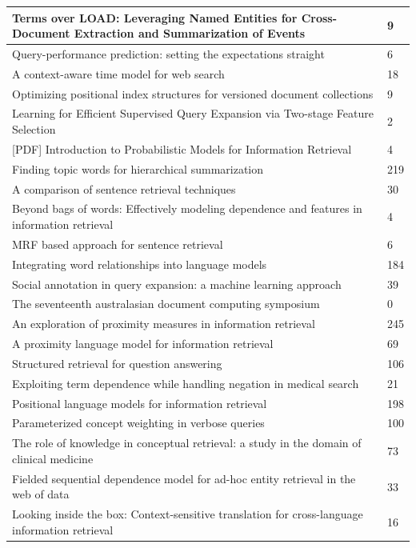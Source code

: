 \documentclass[letterpaper,11pt]{article}
\begin{document}
\begin{center}
\begin{longtable}{|*2{p{3.5cm}| }}
Terms over LOAD: Leveraging Named Entities for Cross-Document Extraction and Summarization of Events & 9 \\ \hline
Query-performance prediction: setting the expectations straight & 6 \\ \hline
A context-aware time model for web search & 18 \\ \hline
Optimizing positional index structures for versioned document collections & 9 \\ \hline
Learning for Efficient Supervised Query Expansion via Two-stage Feature Selection & 2 \\ \hline
[PDF][PDF] Introduction to Probabilistic Models for Information Retrieval & 4 \\ \hline
Finding topic words for hierarchical summarization & 219 \\ \hline
A comparison of sentence retrieval techniques & 30 \\ \hline
Beyond bags of words: Effectively modeling dependence and features in information retrieval & 4 \\ \hline
MRF based approach for sentence retrieval & 6 \\ \hline
Integrating word relationships into language models & 184 \\ \hline
Social annotation in query expansion: a machine learning approach & 39 \\ \hline
The seventeenth australasian document computing symposium & 0 \\ \hline
An exploration of proximity measures in information retrieval & 245 \\ \hline
A proximity language model for information retrieval & 69 \\ \hline
Structured retrieval for question answering & 106 \\ \hline
Exploiting term dependence while handling negation in medical search & 21 \\ \hline
Positional language models for information retrieval & 198 \\ \hline
Parameterized concept weighting in verbose queries & 100 \\ \hline
The role of knowledge in conceptual retrieval: a study in the domain of clinical medicine & 73 \\ \hline
Fielded sequential dependence model for ad-hoc entity retrieval in the web of data & 33 \\ \hline
Looking inside the box: Context-sensitive translation for cross-language information retrieval & 16 \\ \hline

\end{longtable}
\end{center}
\end{document}
